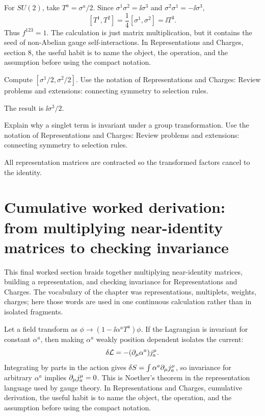 \begin{example}
For \(SU(2)\), take \(T^a=\sigma^a/2\).  Since \(\sigma^1\sigma^2=\ii\sigma^3\) and \(\sigma^2\sigma^1=-\ii\sigma^3\),
\[
  [T^1,T^2]=\frac14[\sigma^1,\sigma^2]=\ii T^3.
\]
Thus \(f^{123}=1\).  The calculation is just matrix multiplication, but it contains the seed of non-Abelian gauge self-interactions.  In Representations and Charges, section 8, the useful habit is to name the object, the operation, and the assumption before using the compact notation.
\end{example}



\begin{exercise}
Compute \([\sigma^1/2,\sigma^2/2]\).  Use the notation of Representations and Charges: Review problems and extensions: connecting symmetry to selection rules.
\begin{answer}
The result is \(\ii\sigma^3/2\).
\end{answer}
\end{exercise}

\begin{exercise}
Explain why a singlet term is invariant under a group transformation.  Use the notation of Representations and Charges: Review problems and extensions: connecting symmetry to selection rules.
\begin{answer}
All representation matrices are contracted so the transformed factors cancel to the identity.
\end{answer}
\end{exercise}



\section{Cumulative worked derivation: from multiplying near-identity matrices to checking invariance}

This final worked section braids together multiplying near-identity matrices, building a representation, and checking invariance for Representations and Charges.  The vocabulary of the chapter was representations, multiplets, weights, charges; here those words are used in one continuous calculation rather than in isolated fragments.

Let a field transform as \(\phi\to (1-\ii\alpha^aT^a)\phi\).  If the Lagrangian is invariant for constant \(\alpha^a\), then making \(\alpha^a\) weakly position dependent isolates the current:
\[
  \delta\mathcal L=-(\partial_\mu\alpha^a)j^\mu_a.
\]
Integrating by parts in the action gives \(\delta S=\int\alpha^a\partial_\mu j^\mu_a\), so invariance for arbitrary \(\alpha^a\) implies \(\partial_\mu j^\mu_a=0\).  This is Noether's theorem in the representation language used by gauge theory.  In Representations and Charges, cumulative derivation, the useful habit is to name the object, the operation, and the assumption before using the compact notation.

